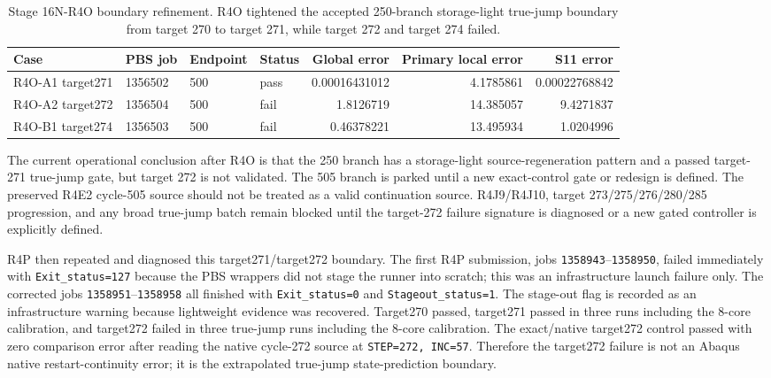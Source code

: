 \documentclass[11pt,a4paper]{article}
\newcommand{\code}[1]{\texttt{#1}}
\begin{document}
\begin{table}[H]
\centering
\small
\begin{tabular}{llllrrr}
\toprule
Case & PBS job & Endpoint & Status & Global error & Primary local error & S11 error \\
\midrule
R4O-A1 target271 & 1356502 & 500 & pass & 0.00016431012 & 4.1785861 & 0.00022768842 \\
R4O-A2 target272 & 1356504 & 500 & fail & 1.8126719 & 14.385057 & 9.4271837 \\
R4O-B1 target274 & 1356503 & 500 & fail & 0.46378221 & 13.495934 & 1.0204996 \\
\bottomrule
\end{tabular}
\caption{Stage 16N-R4O boundary refinement. R4O tightened the accepted 250-branch storage-light true-jump boundary from target 270 to target 271, while target 272 and target 274 failed.}
\end{table}

The current operational conclusion after R4O is that the 250 branch has a storage-light source-regeneration pattern and a passed target-271 true-jump gate, but target 272 is not validated. The 505 branch is parked until a new exact-control gate or redesign is defined. The preserved R4E2 cycle-505 source should not be treated as a valid continuation source. R4J9/R4J10, target 273/275/276/280/285 progression, and any broad true-jump batch remain blocked until the target-272 failure signature is diagnosed or a new gated controller is explicitly defined.

R4P then repeated and diagnosed this target271/target272 boundary. The first R4P submission, jobs \code{1358943}--\code{1358950}, failed immediately with \code{Exit\_status=127} because the PBS wrappers did not stage the runner into scratch; this was an infrastructure launch failure only. The corrected jobs \code{1358951}--\code{1358958} all finished with \code{Exit\_status=0} and \code{Stageout\_status=1}. The stage-out flag is recorded as an infrastructure warning because lightweight evidence was recovered. Target270 passed, target271 passed in three runs including the 8-core calibration, and target272 failed in three true-jump runs including the 8-core calibration. The exact/native target272 control passed with zero comparison error after reading the native cycle-272 source at \code{STEP=272, INC=57}. Therefore the target272 failure is not an Abaqus native restart-continuity error; it is the extrapolated true-jump state-prediction boundary.
\end{document}
